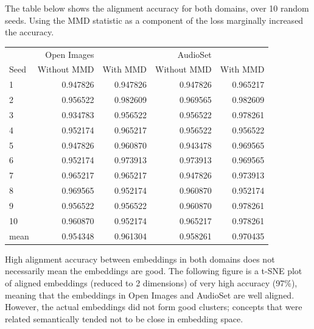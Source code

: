 The table below shows the alignment accuracy for both domains, over 10 random seeds. Using the MMD statistic as a component of the loss marginally increased the accuracy. 

\begin{table}[H]
\centering
\begin{tabular}{lrrrr}
  \toprule
       &    Open Images&               &  AudioSet    &            \\
{Seed} &    Without MMD &   With MMD   &  Without MMD &   With MMD \\
\midrule
1    &       0.947826 &        0.947826&    0.947826 &  0.965217  \\
2    &       0.956522 &        0.982609&    0.969565 &  0.982609  \\
3    &       0.934783 &        0.956522&    0.956522 &  0.978261  \\
4    &       0.952174 &        0.965217&    0.956522 &  0.956522  \\
5    &       0.947826 &        0.960870&    0.943478 &  0.969565  \\
6    &       0.952174 &        0.973913&    0.973913 &  0.969565  \\
7    &       0.965217 &        0.965217&    0.947826 &  0.973913  \\
8    &       0.969565 &        0.952174&    0.960870 &  0.952174  \\
9    &       0.956522 &        0.956522&    0.960870 &  0.978261  \\
10   &       0.960870 &        0.952174&    0.965217 &  0.978261  \\
\midrule                                                         
mean &       0.954348 &        0.961304 &   0.958261 &  0.970435  \\
\bottomrule
\end{tabular}
\end{table}

High alignment accuracy between embeddings in both domains does not necessarily mean the embeddings are good. The following figure is a t-SNE plot of aligned embeddings (reduced to 2 dimensions) of very high accuracy (97\%), meaning that the embeddings in Open Images and AudioSet are well aligned. However, the actual embeddings did not form good clusters; concepts that were related semantically tended not to be close in embedding space. 

